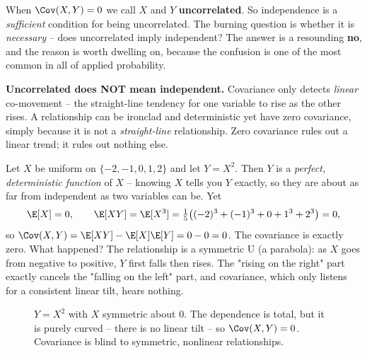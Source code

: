 When $\Cov(X, Y) = 0$ we call $X$ and $Y$ \textbf{uncorrelated}. So independence is
a \emph{sufficient} condition for being uncorrelated. The burning question is
whether it is \emph{necessary} -- does uncorrelated imply independent? The answer is
a resounding \textbf{no}, and the reason is worth dwelling on, because the confusion
is one of the most common in all of applied probability.

\begin{trapbox}
\textbf{Uncorrelated does NOT mean independent.} Covariance only detects
\emph{linear} co-movement -- the straight-line tendency for one variable to rise as
the other rises. A relationship can be ironclad and deterministic yet have zero
covariance, simply because it is not a \emph{straight-line} relationship. Zero
covariance rules out a linear trend; it rules out nothing else.
\end{trapbox}

\begin{example}
\label{ch14:ex-ushape}
Let $X$ be uniform on $\{-2, -1, 0, 1, 2\}$ and let $Y = X^2$. Then $Y$ is a
\emph{perfect, deterministic function} of $X$ -- knowing $X$ tells you $Y$ exactly,
so they are about as far from independent as two variables can be. Yet
\[
\E[X] = 0, \qquad
\E[XY] = \E[X^3] = \tfrac{1}{5}\big((-2)^3 + (-1)^3 + 0 + 1^3 + 2^3\big) = 0,
\]
so $\Cov(X, Y) = \E[XY] - \E[X]\E[Y] = 0 - 0 = 0$. The covariance is exactly zero.
What happened? The relationship is a symmetric U (a parabola): as $X$ goes from
negative to positive, $Y$ first falls then rises. The "rising on the right" part
exactly cancels the "falling on the left" part, and covariance, which only listens
for a consistent linear tilt, hears nothing.
\end{example}

\begin{figure}[H]
\centering
{}
\caption{$Y = X^2$ with $X$ symmetric about $0$. The dependence is total, but it is
purely curved -- there is no linear tilt -- so $\Cov(X, Y) = 0$. Covariance is
blind to symmetric, nonlinear relationships.}
\label{ch14:fig-ushape}
\end{figure}

